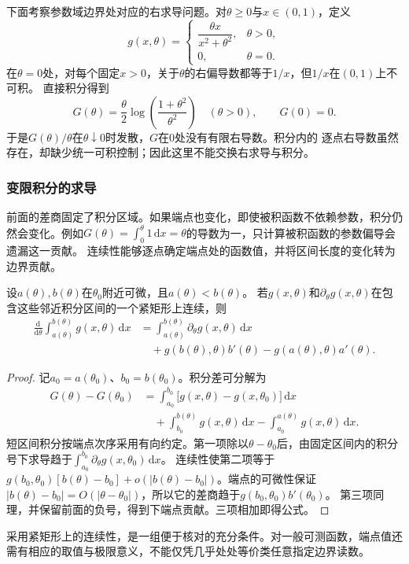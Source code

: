 \begin{example}[参数积分中的控制函数失效]
\label{ex:analysis-parameter-integral-failure}
下面考察参数域边界处对应的右求导问题。对$\theta\geq0$与$x\in(0,1)$，定义
\[   g(x,\theta)   =
\begin{cases}     \dfrac{\theta x}{x^2+\theta^2}, & \theta>0,\\[5pt]     0, & \theta=0.
\end{cases} \]
在$\theta=0$处，对每个固定$x>0$，关于$\theta$的右偏导数都等于$1/x$，但$1/x$在$(0,1)$上不可积。
直接积分得到
\[   G(\theta)   =   \frac{\theta}{2}   \log\left(\frac{1+\theta^2}{\theta^2}\right)   \quad(\theta>0),   \qquad G(0)=0. \]
于是$G(\theta)/\theta$在$\theta\downarrow0$时发散，$G$在$0$处没有有限右导数。积分内的
逐点右导数虽然存在，却缺少统一可积控制；因此这里不能交换右求导与积分。
\end{example}

\subsubsection{变限积分的求导}

前面的差商固定了积分区域。如果端点也变化，即使被积函数不依赖参数，积分仍然会变化。例如$G(\theta)=\int_0^\theta1\,\mathrm dx=\theta$的导数为一，只计算被积函数的参数偏导会遗漏这一贡献。
连续性能够逐点确定端点处的函数值，并将区间长度的变化转为边界贡献。
\begin{theorem}[变限参数积分的求导]
设$a(\theta),b(\theta)$在$\theta_0$附近可微，且$a(\theta)<b(\theta)$。
若$g(x,\theta)$和$\partial_\theta g(x,\theta)$在包含这些邻近积分区间的一个紧矩形上连续，则
\begin{equation}
 \begin{aligned}
 \frac{\mathrm d}{\mathrm d\theta}\int_{a(\theta)}^{b(\theta)}g(x,\theta)\,\mathrm dx
 &=\int_{a(\theta)}^{b(\theta)}\partial_\theta g(x,\theta)\,\mathrm dx\\
 &\quad+g(b(\theta),\theta)b'(\theta)
 -g(a(\theta),\theta)a'(\theta).
 \end{aligned}
\label{eq:measurable-moving-boundary-integral}
\end{equation}
\end{theorem}
\begin{proof}
记$a_0=a(\theta_0)$、$b_0=b(\theta_0)$。积分差可分解为
\[
 \begin{aligned}
 G(\theta)-G(\theta_0)
 &=\int_{a_0}^{b_0}\bigl[g(x,\theta)-g(x,\theta_0)\bigr]\,\mathrm dx\\
 &\quad+\int_{b_0}^{b(\theta)}g(x,\theta)\,\mathrm dx
 -\int_{a_0}^{a(\theta)}g(x,\theta)\,\mathrm dx.
 \end{aligned}
\]
短区间积分按端点次序采用有向约定。第一项除以$\theta-\theta_0$后，由固定区间内的积分号下求导趋于$\int_{a_0}^{b_0}\partial_\theta g(x,\theta_0)\,\mathrm dx$。
连续性使第二项等于
$g(b_0,\theta_0)[b(\theta)-b_0]+o(|b(\theta)-b_0|)$。端点的可微性保证$|b(\theta)-b_0|=O(|\theta-\theta_0|)$，所以它的差商趋于$g(b_0,\theta_0)b'(\theta_0)$。
第三项同理，并保留前面的负号，得到下端点贡献。三项相加即得公式。
\end{proof}

采用紧矩形上的连续性，是一组便于核对的充分条件。对一般可测函数，端点值还需有相应的取值与极限意义，不能仅凭几乎处处等价类任意指定边界读数。

\FloatBarrier
